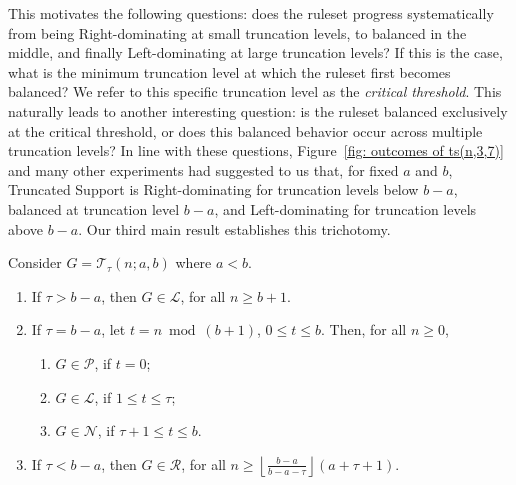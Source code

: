 \documentclass[oneside,reqno]{amsart}
\newcommand{\ts}{\mathcal{T}}
\newcommand{\lp}{\mathscr{L}}
\newcommand{\rp}{\mathscr{R}}
\newcommand{\np}{\mathscr{N}}
\newcommand{\pp}{\mathscr{P}}
\begin{document}
This motivates the following questions: does the ruleset progress systematically from being Right-dominating at small truncation levels, to balanced in the middle, and finally Left-dominating at large truncation levels? If this is the case, what is the minimum truncation level at which the ruleset first becomes balanced? We refer to this specific truncation level as the \emph{critical threshold}. This naturally leads to another interesting question: is the ruleset balanced exclusively at the critical threshold, or does this balanced behavior occur across multiple truncation levels?
In line with these questions, Figure~\ref{fig: outcomes of ts(n,3,7)} and many other experiments had suggested to us that, for fixed $a$ and $b$, {\sc Truncated Support} is Right-dominating for truncation levels below $b-a$, balanced at truncation level $b-a$, and Left-dominating for truncation levels above $b-a$. Our third main result establishes this trichotomy.

\begin{theorem}[Outcomes of TS]\label{thm: outcomes of TS}
    Consider $G=\ts_\tau(n;a,b)$ where $a<b$. 
    \begin{enumerate}
        \item\label{item:thm: outcomes of TS:1} If $\tau>b-a$, then $G\in \lp$, for all $n\ge b+1$.
        \item\label{item:thm: outcomes of TS:2} If $\tau=b-a$, let $t = n\bmod (b+1)$, $0\le t\le b$. Then, for all $n\ge 0$,
        \begin{enumerate}
            \item $G\in \pp$, if $t=0$;  
            \item $G\in \lp$, if $1\le t\le \tau$;
            \item $G\in \np$, if $\tau+1\le t\le b$. 
            \end{enumerate}
        \item\label{item:thm: outcomes of TS:3} If $\tau<b-a$, then $G\in \rp$, for all $n\ge \left\lfloor\frac{b-a}{b-a-\tau}\right\rfloor\!(a+\tau+1)$.
        \end{enumerate}
\end{theorem}
\end{document}
